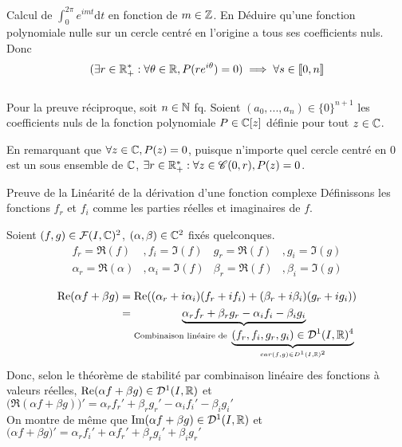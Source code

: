 \documentclass{article}
\renewenvironment{question_kholle}[2][ ]
{
	\subsection{\texorpdfstring{#2}{}}
	\notblank{#1}
	{
		\noindent #1
		\bigbreak
	}
	{}
	\begin{proof}
}
{
	\end{proof}
}
\begin{document}
\begin{question_kholle}{Calcul de $\int_0^{2\pi}e^{imt} \mathrm d t$ en fonction de $m \in \mathbb Z$. En Déduire qu'une fonction polynomiale nulle sur un cercle centré en l'origine a tous ses coefficients nuls.}
	Donc $$
		(\exists r \in \mathbb R_+^* : \forall \theta \in \mathbb R, P(re^{i\theta})=0) \implies \forall s \in [ \! [0, n] \! ]
	$$
	\\
	Pour la preuve réciproque,  soit $n \in \mathbb N$ fq. Soient $(a_0,...,a_n) \in \{ 0 \} ^{n+1}$ les coefficients nuls de la fonction polynomiale $P \in \mathbb C[z]$ définie pour tout $z \in \mathbb C$.

	En remarquant que $\forall z \in \mathbb C , P(z) = 0$, puisque n'importe quel cercle centré en 0 est un sous ensemble de $\mathbb C$,  $\exists r \in \mathbb R_+^*: \forall z \in \mathscr C(0, r), P(z) = 0$.
\end{question_kholle}

\begin{question_kholle}{Preuve de la Linéarité de la dérivation d'une fonction complexe}
	Définissons les fonctions $f_r$ et $f_i$ comme les parties réelles et imaginaires de $f$.

	Soient $(f, g) \in \mathcal{F}(I, \mathbb C)^2$, $(\alpha, \beta) \in \mathbb C^2$ fixés quelconques.
	\begin{align*}
		f_r = \Re(f)           & , f_i = \Im(f)      & g_r = \Re(f)     & , g_i = \Im(g)     \\
		\alpha_r = \Re(\alpha) & , \alpha_i = \Im(f) & \beta_r = \Re(f) & , \beta_i = \Im(g)
	\end{align*}

	\begin{align*}
		\text{Re}( \alpha f + \beta g) & = \text{Re}((\alpha_r + i \alpha_i)(f_r + i f_i) + (\beta_r+ i\beta_i)(g_r+ i g_i))                                                                                                                     \\
		                         & = \underbrace{\alpha_r f_r + \beta_r g_r - \alpha_i f_i - \beta_i g_i}_{\text{Combinaison linéaire de } \underbrace{(f_r, f_i, g_r, g_i) \in \mathcal D^1(I, \mathbb R)^4}_{car (f,g) \in D^1(I, \mathbb R)^2}}
	\end{align*}
	Donc, selon le théorème de stabilité par combinaison linéaire des fonctions à valeurs réelles, $\text{Re}(\alpha f + \beta g) \in \mathcal D^1(I, \mathbb R)$ et $\big(\Re(\alpha f + \beta g)\big)' = \alpha_r f_r' + \beta_r g_r' - \alpha_i f_i' - \beta_i g_i'$
	\\
	On montre de même que $\text{Im}(\alpha f + \beta g) \in \mathcal D^1(I, \mathbb R)$ et $\big(\alpha f + \beta g\big)' = \alpha_r f_i' +\alpha f_r' +\beta_r g_i' +\beta_i g_r'$


\end{question_kholle}
\end{document}

